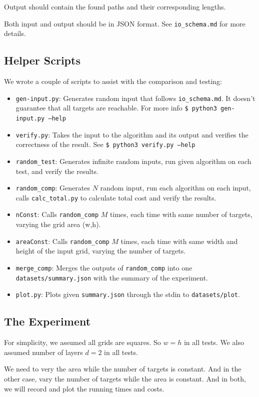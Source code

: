 Output should contain the found paths and their corresponding lengths.

Both input and output should be in JSON format. See \texttt{io\_schema.md} for more details.

\subsection{Helper Scripts}
We wrote a couple of scripts to assist with the comparison and testing:
\begin{itemize}
    \item \texttt{gen-input.py}: Generates random input that follows \texttt{io\_schema.md}. It doesn't guarantee that all targets are reachable. For more info \texttt{\$ python3 gen-input.py --help}
    \item \texttt{verify.py}: Takes the input to the algorithm and its output and verifies the correctness of the result. See \texttt{\$ python3 verify.py --help}
    \item \texttt{random\_test}: Generates infinite random inputs, run given algorithm on each test, and verify the results.
    \item \texttt{random\_comp}: Generates $N$ random input, run each algorithm on each input, calls \texttt{calc\_total.py} to calculate total cost and verify the results.
    \item \texttt{nConst}: Calls \texttt{random\_comp} $M$ times, each time with same number of targets, varying the grid area (w,h).
    \item \texttt{areaConst}: Calls \texttt{random\_comp} $M$ times, each time with same width and height of the input grid, varying the number of targets.
    \item \texttt{merge\_comp}: Merges the outputs of \texttt{random\_comp} into one \texttt{datasets/summary.json} with the summary of the experiment.
    \item \texttt{plot.py}: Plots given \texttt{summary.json} through the stdin to \texttt{datasets/plot}.
\end{itemize}

\subsection{The Experiment}
For simplicity, we assumed all grids are squares. So $w=h$ in all tests.
We also assumed number of layers $d=2$ in all tests.

We need to very the area while the number of targets is constant. And in the other case, vary the number of targets while the area is constant.
And in both, we will record and plot the running times and costs.

